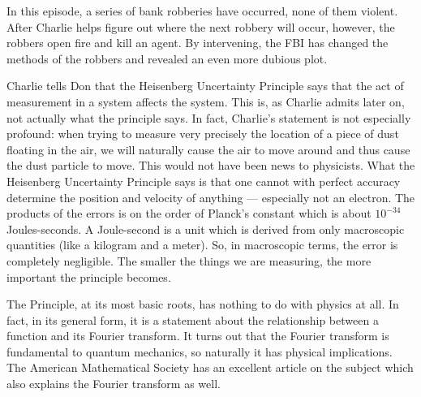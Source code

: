 \newpage
{}
{}

In this episode, a series of bank robberies have occurred, none of them violent. After Charlie helps figure out where the next robbery will occur, however, the robbers open fire and kill an agent. By intervening, the FBI has changed the methods of the robbers and revealed an even more dubious plot.



Charlie tells Don that the Heisenberg Uncertainty Principle says that the act of measurement in a system affects the system. This is, as Charlie admits later on, not actually what the principle says. In fact, Charlie's statement is not especially profound: when trying to measure very precisely the location of a piece of dust floating in the air, we will naturally cause the air to move around and thus cause the dust particle to move. This would not have been news to physicists. What the Heisenberg Uncertainty Principle says is that one cannot with perfect accuracy determine the position and velocity of anything --- especially not an electron. The products of the errors is on the order of Planck's constant which is about $10^{-34}$ Joules-seconds. A Joule-second is a unit which is derived from only macroscopic quantities (like a kilogram and a meter). So, in macroscopic terms, the error is completely negligible. The smaller the things we are measuring, the more important the principle becomes. 


The Principle, at its most basic roots, has nothing to do with physics at all. In fact, in its general form, it is a statement about the relationship between a function and its Fourier transform. It turns out that the Fourier transform is fundamental to quantum mechanics, so naturally it has physical implications. The American Mathematical Society has an excellent article on the subject which also explains the Fourier transform as well. 




